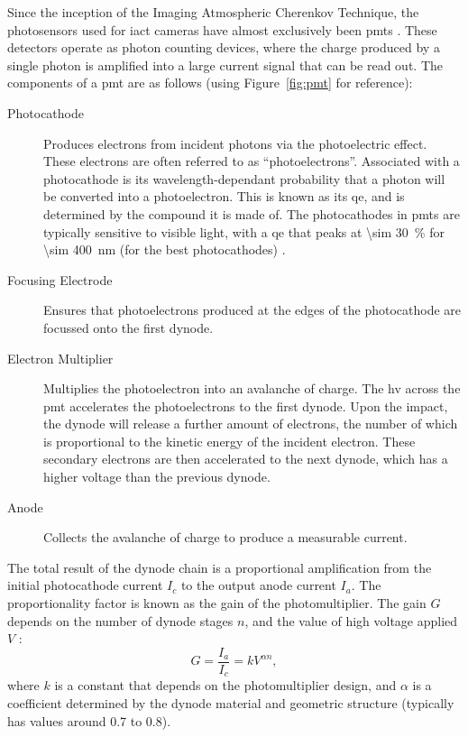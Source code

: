 Since the inception of the Imaging Atmospheric Cherenkov Technique, the photosensors used for \gls{iact} cameras have almost exclusively been \glspl{pmt} \cite{Weekes2003}. These detectors operate as photon counting devices, where the charge produced by a single photon is amplified into a large current signal that can be read out. The components of a \gls{pmt} are as follows (using Figure~\ref{fig:pmt} for reference):
\begin{description}
\item [Photocathode] Produces electrons from incident photons via the photoelectric effect. These electrons are often referred to as ``photoelectrons''. Associated with a photocathode is its wavelength-dependant probability that a photon will be converted into a photoelectron. This is known as its \gls{qe}, and is determined by the compound it is made of. The photocathodes in \glspl{pmt} are typically sensitive to visible light, with a \gls{qe} that peaks at \SI{\sim 30}{\percent} for \SI{\sim 400}{nm} (for the best photocathodes) \cite{Hamamatsu2016}.
\item [Focusing Electrode] Ensures that photoelectrons produced at the edges of the photocathode are focussed onto the first dynode.
\item [Electron Multiplier] Multiplies the photoelectron into an avalanche of charge. The \gls{hv} across the \gls{pmt} accelerates the photoelectrons to the first dynode. Upon the impact, the dynode will release a further amount of electrons, the number of which is proportional to the kinetic energy of the incident electron. These secondary electrons are then accelerated to the next dynode, which has a higher voltage than the previous dynode.
\item [Anode] Collects the avalanche of charge to produce a measurable current. 
\end{description}

The total result of the dynode chain is a proportional amplification from the initial photocathode current $I_c$ to the output anode current $I_a$. The proportionality factor is known as the gain of the photomultiplier. The gain $G$ depends on the number of dynode stages $n$, and the value of high voltage applied $V$ \cite{Hamamatsu2016}:
\begin{equation} \label{eq:pmt_gain}
G = \frac{I_a}{I_c} = k V^{\alpha n},
\end{equation}
where $k$ is a constant that depends on the photomultiplier design, and $\alpha$ is a coefficient determined by the dynode material and geometric structure (typically has values around 0.7 to 0.8).

